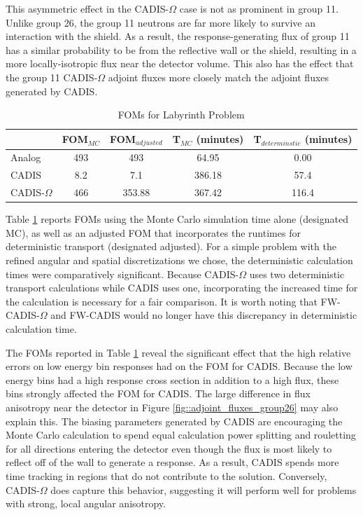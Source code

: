 \documentclass[12pt]{article}
\begin{document}
This asymmetric effect in the CADIS-$\Omega$ case is not as prominent in group 11. 
Unlike group 26, the group 11 neutrons are far more likely to survive an interaction with the shield. As a result, the response-generating flux of group 11 has a similar probability to be from the reflective wall or the shield, resulting in a more locally-isotropic flux near the detector volume. This also has the effect that the group 11 CADIS-$\Omega$ adjoint fluxes more closely match the adjoint fluxes generated by CADIS. 

 \begin{table}
  \centering
  \caption{\label{tab:FOMLabI}FOMs for Labyrinth Problem}
  \begin{tabular}{l|cc|cc}
    \toprule
    \hline
        & FOM$_{MC}$ & FOM$_{adjusted}$ & T$_{MC}$ (minutes) & T$_{determinstic}$ (minutes) \\
    \hline
    Analog           & 493   &  493     & 64.95      & 0.00 \\ 
    CADIS            & 8.2   &  7.1     & 386.18     & 57.4  \\
    CADIS-$\Omega$   & 466   &  353.88  & 367.42     & 116.4  \\  
	\bottomrule
  \end{tabular}
\end{table}

Table \ref{tab:FOMLabI} reports FOMs using the Monte Carlo simulation time alone (designated MC), as well as an adjusted FOM that incorporates the runtimes for deterministic transport (designated adjusted). For a simple problem with the refined angular and spatial discretizations we chose, the deterministic calculation times were comparatively significant.
Because CADIS-$\Omega$ uses two deterministic transport calculations while CADIS uses one, incorporating the increased time for the calculation is necessary for a fair comparison.
It is worth noting that FW-CADIS-$\Omega$ and FW-CADIS would no longer have this discrepancy in deterministic calculation time.

The FOMs reported in Table \ref{tab:FOMLabI} reveal the significant effect that the high relative errors on low energy bin responses had on the FOM for CADIS. Because the low energy bins had a high response cross section in addition to a high flux, these bins strongly affected the FOM for CADIS. The large difference in flux anisotropy near the detector in Figure \ref{fig::adjoint_fluxes_group26} may also explain this. The biasing parameters generated by CADIS are encouraging the Monte Carlo calculation to spend equal calculation power splitting and rouletting for all directions entering the detector even though the flux is most likely to reflect off of the wall to generate a response. As a result, CADIS spends more time tracking in regions that do not contribute to the solution. Conversely, CADIS-$\Omega$ does capture this behavior, suggesting it will perform well for problems with strong, local angular anisotropy.  
\end{document}
